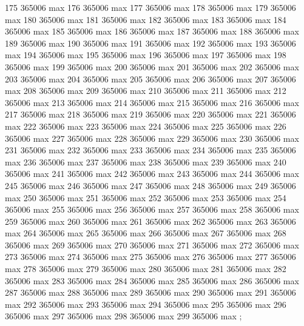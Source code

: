 {175 365006 max
176 365006 max
177 365006 max
178 365006 max
179 365006 max
180 365006 max
181 365006 max
182 365006 max
183 365006 max
184 365006 max
185 365006 max
186 365006 max
187 365006 max
188 365006 max
189 365006 max
190 365006 max
191 365006 max
192 365006 max
193 365006 max
194 365006 max
195 365006 max
196 365006 max
197 365006 max
198 365006 max
199 365006 max
200 365006 max
201 365006 max
202 365006 max
203 365006 max
204 365006 max
205 365006 max
206 365006 max
207 365006 max
208 365006 max
209 365006 max
210 365006 max
211 365006 max
212 365006 max
213 365006 max
214 365006 max
215 365006 max
216 365006 max
217 365006 max
218 365006 max
219 365006 max
220 365006 max
221 365006 max
222 365006 max
223 365006 max
224 365006 max
225 365006 max
226 365006 max
227 365006 max
228 365006 max
229 365006 max
230 365006 max
231 365006 max
232 365006 max
233 365006 max
234 365006 max
235 365006 max
236 365006 max
237 365006 max
238 365006 max
239 365006 max
240 365006 max
241 365006 max
242 365006 max
243 365006 max
244 365006 max
245 365006 max
246 365006 max
247 365006 max
248 365006 max
249 365006 max
250 365006 max
251 365006 max
252 365006 max
253 365006 max
254 365006 max
255 365006 max
256 365006 max
257 365006 max
258 365006 max
259 365006 max
260 365006 max
261 365006 max
262 365006 max
263 365006 max
264 365006 max
265 365006 max
266 365006 max
267 365006 max
268 365006 max
269 365006 max
270 365006 max
271 365006 max
272 365006 max
273 365006 max
274 365006 max
275 365006 max
276 365006 max
277 365006 max
278 365006 max
279 365006 max
280 365006 max
281 365006 max
282 365006 max
283 365006 max
284 365006 max
285 365006 max
286 365006 max
287 365006 max
288 365006 max
289 365006 max
290 365006 max
291 365006 max
292 365006 max
293 365006 max
294 365006 max
295 365006 max
296 365006 max
297 365006 max
298 365006 max
299 365006 max
};
